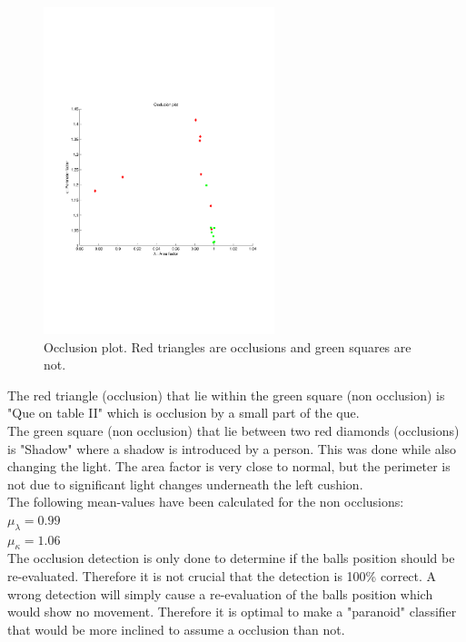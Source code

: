 \begin{figure}[H]
\begin{center}
\leavevmode
\includegraphics[width=0.6\textwidth]{images/occlusion_plot}
\end{center}
\caption{Occlusion plot. Red triangles are occlusions and green squares are not.}
\label{fig:occlusion_plot}
\end{figure}

The red triangle (occlusion) that lie within the green square (non occlusion) is "Que on table II" which is occlusion by a small part of the que.\\

The green square (non occlusion) that lie between two red diamonds (occlusions) is "Shadow" where a shadow is introduced by a person. This was done while also changing the light. The area factor is very close to normal, but the perimeter is not due to significant light changes underneath the left cushion.\\

The following mean-values have been calculated for the non occlusions:\\

$\mu_{\lambda} = 0.99$\\
$\mu_{\kappa} = 1.06$\\

The occlusion detection is only done to determine if the balls position should be re-evaluated. Therefore it is not crucial that the detection is 100\% correct. A wrong detection will simply cause a re-evaluation of the balls position which would show no movement. Therefore it is optimal to make a "paranoid" classifier that would be more inclined to assume a occlusion than not.\\

